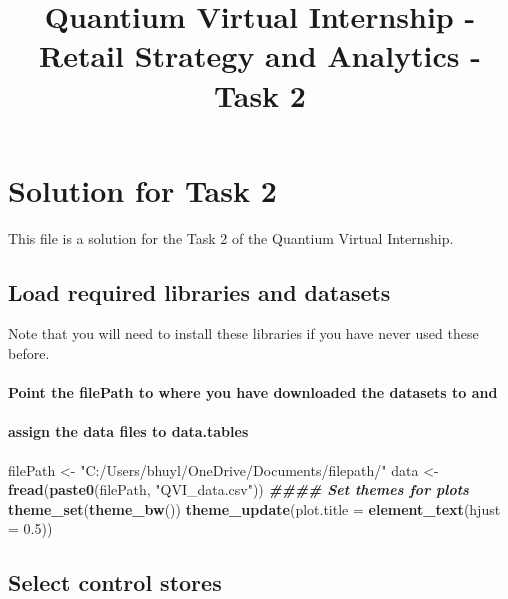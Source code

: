 \documentclass[
]{article}
\title{Quantium Virtual Internship - Retail Strategy and Analytics -
Task 2}
\author{}
\date{\vspace{-2.5em}}
\newenvironment{Shaded}{\begin{snugshade}}{\end{snugshade}}
\newcommand{\AttributeTok}[1]{\textcolor[rgb]{0.13,0.29,0.53}{#1}}
\newcommand{\DocumentationTok}[1]{\textcolor[rgb]{0.56,0.35,0.01}{\textbf{\textit{#1}}}}
\newcommand{\FloatTok}[1]{\textcolor[rgb]{0.00,0.00,0.81}{#1}}
\newcommand{\FunctionTok}[1]{\textcolor[rgb]{0.13,0.29,0.53}{\textbf{#1}}}
\newcommand{\NormalTok}[1]{#1}
\newcommand{\OtherTok}[1]{\textcolor[rgb]{0.56,0.35,0.01}{#1}}
\newcommand{\StringTok}[1]{\textcolor[rgb]{0.31,0.60,0.02}{#1}}
\begin{document}
\maketitle

\section{Solution for Task 2}\label{solution-for-task-2}

This file is a solution for the Task 2 of the Quantium Virtual
Internship.

\subsection{Load required libraries and
datasets}\label{load-required-libraries-and-datasets}

Note that you will need to install these libraries if you have never
used these before.

\paragraph{Point the filePath to where you have downloaded the datasets
to
and}\label{point-the-filepath-to-where-you-have-downloaded-the-datasets-to-and}

\paragraph{assign the data files to
data.tables}\label{assign-the-data-files-to-data.tables}

\begin{Shaded}
\begin{Highlighting}[]
\NormalTok{filePath }\OtherTok{\textless{}{-}} \StringTok{"C:/Users/bhuyl/OneDrive/Documents/filepath/"}
\NormalTok{data }\OtherTok{\textless{}{-}} \FunctionTok{fread}\NormalTok{(}\FunctionTok{paste0}\NormalTok{(filePath, }\StringTok{"QVI\_data.csv"}\NormalTok{))}
\DocumentationTok{\#\#\#\# Set themes for plots}
\FunctionTok{theme\_set}\NormalTok{(}\FunctionTok{theme\_bw}\NormalTok{())}
\FunctionTok{theme\_update}\NormalTok{(}\AttributeTok{plot.title =} \FunctionTok{element\_text}\NormalTok{(}\AttributeTok{hjust =} \FloatTok{0.5}\NormalTok{))}
\end{Highlighting}
\end{Shaded}

\subsection{Select control stores}\label{select-control-stores}
\end{document}
